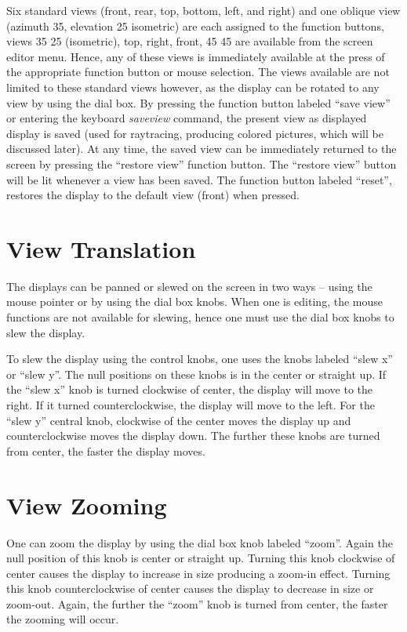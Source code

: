 Six standard views (front, rear, top, bottom, left, and right) and one
oblique view (azimuth 35, elevation 25 isometric) are each assigned to the
function buttons, views 35 25 (isometric), top, right, front,
45 45 are available from the screen editor menu.  Hence, any of these views
is immediately available at the press of the appropriate function button or
mouse selection.  The views available are not limited to these standard views
however, as the display can be rotated to any view by using the dial box.  By
pressing the function button labeled ``save view'' or entering
the keyboard {\em saveview} command, the present view as displayed display is
saved (used for raytracing,
producing colored pictures, which will be discussed later).
At any time, the saved view can be immediately returned to the
screen by pressing the ``restore view'' function button.  The
``restore view'' button will be lit whenever a view has been saved.
The function button labeled ``reset'',
restores the display to the default view (front) when pressed.

\section{View Translation}

The displays can be panned or slewed on the screen in two ways -- using the
mouse pointer or by using the dial box knobs.  When one is editing, the mouse
functions are not available for slewing, hence one must use the dial box knobs
to slew the display.

To slew the display using the control knobs, one uses the knobs labeled
``slew x'' or ``slew y''.  The null positions on these knobs is in the
center or straight up.  If the ``slew x'' knob is turned clockwise of center,
the display will move to the right.  If it turned counterclockwise, the
display will move to the left.  For the ``slew y'' central knob, clockwise
of the center moves the display up and counterclockwise moves the display
down.  The further these knobs are turned from center, the faster the display
moves.

\section{View Zooming}

One can zoom the display by using the dial box knob labeled ``zoom''.
Again the null position of this knob is center or straight
up.  Turning this knob clockwise of center causes the display to increase in
size producing a zoom-in effect.  Turning this knob counterclockwise of center
causes the display to decrease in size or zoom-out.  Again, the further the
``zoom'' knob is turned from center, the faster the zooming will occur.

